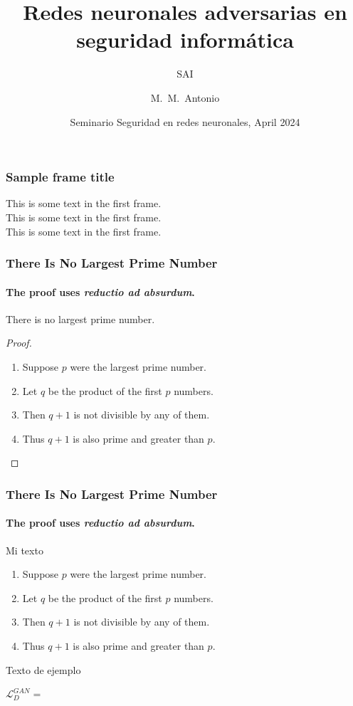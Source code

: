 \documentclass{beamer}
\title[SAI] %
{Redes neuronales adversarias en seguridad informática}
\subtitle{SAI}
\author[Antonio, Mudarra Machuca] %
{M.~M.~Antonio\inst{1}}
\institute[UJAEN] %
{
  \inst{1}%
  Sistemas Inteligentes y Minería de Datos\\
  Escuela Politécnica Superior de Jaén\\
  Universidad de Jaén
}
\date[SAI 2024] %
{Seminario Seguridad en redes neuronales, April 2024}
\begin{document}
\frame{\titlepage}

\begin{frame}
    \frametitle{Sample frame title}
    This is some text in the first frame. \\
    This is some text in the first frame. \\
    This is some text in the first frame.
\end{frame}

\begin{frame}
    \frametitle{There Is No Largest Prime Number}
    \framesubtitle{The proof uses \textit{reductio ad absurdum}.}
    \begin{theorem}
        There is no largest prime number.
    \end{theorem}
    \begin{proof}
        \begin{enumerate}
            \item<1-| alert@1> Suppose $p$ were the largest prime number.
            \item<2-> Let $q$ be the product of the first $p$ numbers.
            \item<3-> Then $q+1$ is not divisible by any of them.
            \item<1-> Thus $q+1$ is also prime and greater than $p$.\qedhere
        \end{enumerate}
    \end{proof}
\end{frame}


\begin{frame}
    \frametitle{There Is No Largest Prime Number}
    \framesubtitle{The proof uses \textit{reductio ad absurdum}.}

    \begin{block}{Mi texto}
        \begin{enumerate}
            \item<1-| alert@1> Suppose $p$ were the largest prime number.
            \item<2-> Let $q$ be the product of the first $p$ numbers.
            \item<3-> Then $q+1$ is not divisible by any of them.
            \item<4-> Thus $q+1$ is also prime and greater than $p$.\qedhere
        \end{enumerate}
    \end{block}

    \pause[4]
    \begin{example}
        Texto de ejemplo
    \end{example}
\end{frame}

\begin{frame}
    \centering
    \begin{math}
        \mathcal{L}_{D}^{GAN} =
    \end{math}
\end{frame}
\end{document}
